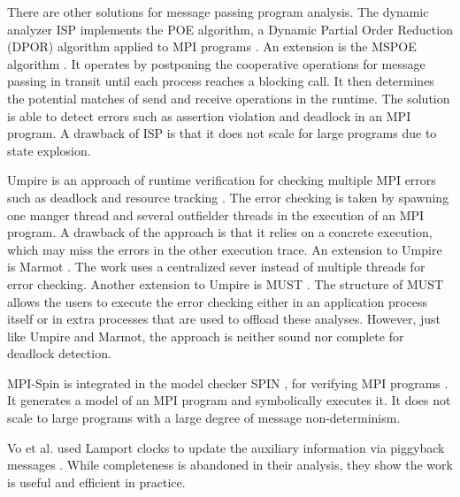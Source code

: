 There are other solutions for message passing program analysis.
The dynamic analyzer ISP implements the POE algorithm, a Dynamic Partial Order Reduction (DPOR) algorithm \cite{DBLP:conf/popl/FlanaganG05} applied to MPI programs \cite{DBLP:conf/ppopp/VakkalankaSGK08}. 
An extension is the MSPOE algorithm \cite{DBLP:conf/sbmf/SharmaGB12}. It operates by postponing the cooperative operations for message passing in transit until each process reaches a blocking call. It then determines the potential matches of send and receive operations in the runtime. The solution is able to detect errors such as assertion violation and deadlock in an MPI program.
A drawback of ISP is that it does not scale for large programs due to state explosion.

Umpire is an approach of runtime verification for checking multiple MPI errors such as deadlock and resource tracking \cite{DBLP:conf/sc/VetterS00}. The error checking is taken by spawning one manger thread and several outfielder threads in the execution of an MPI program. A drawback of the approach is that it relies on a concrete execution, which may miss the errors in the other execution trace.
An extension to Umpire is Marmot \cite{DBLP:conf/parco/KrammerBMR03}. The work uses a centralized sever instead of multiple threads for error checking. Another extension to Umpire is MUST \cite{DBLP:conf/ptw/HilbrichSSM09}. The structure of MUST allows the users to execute the error checking either in an application process itself or in extra processes that are used to offload these analyses. 
However, just like Umpire and Marmot, the approach is neither sound nor complete for deadlock detection. 

MPI-Spin is integrated in the model checker SPIN \cite{DBLP:journals/tse/Holzmann97}, for verifying MPI programs \cite{DBLP:conf/vmcai/Siegel07,DBLP:conf/pvm/Siegel07}. It generates a model of an MPI program and symbolically executes it. It does not scale to large programs with a large degree of message non-determinism.

Vo et al. used Lamport clocks to update the auxiliary information via piggyback messages \cite{DBLP:conf/sc/VoAGSSB10,DBLP:conf/IEEEpact/VoGKSSB11}. While completeness is abandoned in their analysis, they show the work is useful and efficient in practice. 



